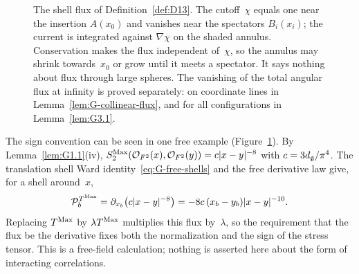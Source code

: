 \begin{figure}[t]
\centering
{}
\caption{The shell flux of Definition~\ref{def:D13}. The cutoff~$\chi$ equals one near the insertion $A(x_0)$ and vanishes near the spectators $B_i(x_i)$; the current is integrated against $\nabla\chi$ on the shaded annulus. Conservation makes the flux independent of~$\chi$, so the annulus may shrink towards~$x_0$ or grow until it meets a spectator. It says nothing about flux through large spheres. The vanishing of the total angular flux at infinity is proved separately: on coordinate lines in Lemma~\ref{lem:G-collinear-flux}, and for all configurations in Lemma~\ref{lem:G3.1}.}
\label{fig:G-shell}
\end{figure}

The sign convention can be seen in one free example (Figure~\ref{fig:G-shell}). By Lemma~\ref{lem:G1.1}(iv), $S^{\mathrm{Max}}_2(\mathcal{O}_{F^2}(x),\mathcal{O}_{F^2}(y))=c|x-y|^{-8}$ with $c=3d_{\mathfrak{g}}/\pi^4$. The translation shell Ward identity~\eqref{eq:G-free-shells} and the free derivative law give, for a shell around~$x$,
\begin{equation*}
\mathcal P_b^{T^{\mathrm{Max}}}=\partial_{x_b}\bigl(c|x-y|^{-8}\bigr)=-8c\,(x_b-y_b)|x-y|^{-10}.
\end{equation*}
Replacing $T^{\mathrm{Max}}$ by $\lambda T^{\mathrm{Max}}$ multiplies this flux by~$\lambda$, so the requirement that the flux be the derivative fixes both the normalization and the sign of the stress tensor. This is a free-field calculation; nothing is asserted here about the form of interacting correlations.

